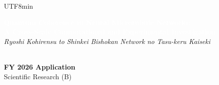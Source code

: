 \documentclass[11pt,a4paper]{article}
\newcommand{\bilabel}[2]{%
  \textbf{\textcolor{jspsNavy}{#1}}\enspace{\footnotesize\textcolor{jspsSlate}{(#2)}}%
}
\begin{document}
\begin{CJK}{UTF8}{min}

\begin{tcolorbox}[jspsBanner]
  \begin{minipage}{0.72\linewidth}
    \textcolor{white}{\Large\bfseries
      Quantum Coherence in Neural Microtubule Networks:\\[2pt]
      A Cross-Scale Computational and Experimental Investigation}\\[6pt]
    {\small\textcolor{jspsGold!80!white}{%
      \textit{Ryoshi Kohirensu to Shinkei Bishokan Net\-work no Tasu-keru Kaiseki}%
    }}%
  \end{minipage}%
  \hfill
  \begin{minipage}{0.25\linewidth}
    \raggedleft
    \\[4pt]
    \textcolor{jspsGold}{\footnotesize\bfseries FY 2026 Application}\\
    \textcolor{white!70!jspsNavy}{\scriptsize Scientific Research (B)}
  \end{minipage}
\end{tcolorbox}

\vspace{4pt}

\begin{tcolorbox}[jspsSection,
  title={\faUser\enspace \bilabel{Applicant Information}{申請者情報} \hfill \small Section 1}]


\end{tcolorbox}
\end{CJK}
\end{document}
